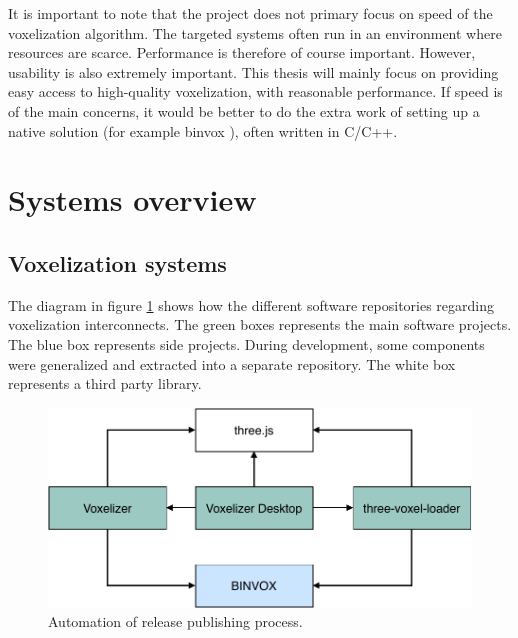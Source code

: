 It is important to note that the project does not primary focus on speed of the voxelization algorithm. The targeted systems often run in an environment where resources are scarce. Performance is therefore of course important. However, usability is also extremely important. This thesis will mainly focus on providing easy access to high-quality voxelization, with reasonable performance. If speed is of the main concerns, it would be better to do the extra work of setting up a native solution (for example binvox \cite{binvox}), often written in C/C++.

\section{Systems overview}
\subsection{Voxelization systems}
The diagram in figure \ref{fig:voxel-systems-overview} shows how the different software repositories regarding voxelization interconnects. The green boxes represents the main software projects. The blue box represents side projects. During development, some components were generalized and extracted into a separate repository. The white box represents a third party library.
\begin{figure}[ht]
    \centering
    \includegraphics[page=1,scale=0.85]{sections/introduction/figures/voxel-systems-overview.pdf}
    \caption{Automation of release publishing process.}
    \label{fig:voxel-systems-overview}
\end{figure}

